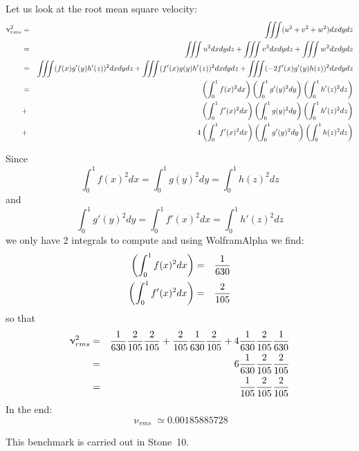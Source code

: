 Let us look at the root mean square velocity:
\begin{eqnarray}
\upnu_{rms}^2 
&=& \iiint   (u^2+v^2+w^2) dxdydz \nonumber\\
&=& \iiint   u^2 dxdydz
+ \iiint   v^2 dxdydz
+ \iiint   w^2 dxdydz \nonumber\\
&=& \iiint  (f(x)g'(y)h'(z))^2 dxdydz
+ \iiint   (f'(x)g(y)h'(z))^2 dxdydz
+ \iiint   (-2f'(x)g'(y)h(z))^2 dxdydz \nonumber\\
&=& 
\left( \int_0^1 f(x)^2 dx \right)
\left( \int_0^1 g'(y)^2 dy \right)
\left( \int_0^1 h'(z)^2 dz \right) \nonumber\\
&+&
\left( \int_0^1 f'(x)^2 dx \right)
\left( \int_0^1 g(y)^2 dy \right)
\left( \int_0^1 h'(z)^2 dz \right) \nonumber\\
&+&4
\left( \int_0^1 f'(x)^2 dx \right)
\left( \int_0^1 g'(y)^2 dy \right)
\left( \int_0^1 h(z)^2 dz \right) \nonumber\\
\end{eqnarray}

Since 
\[
\int_0^1 f(x)^2 dx  =  \int_0^1 g(y)^2 dy
= \int_0^1 h(z)^2 dz
\]
and
\[
\int_0^1 g'(y)^2 dy = \int_0^1 f'(x)^2 dx  =  \int_0^1 h'(z)^2 dz
\]
we only have 2 integrals to compute and using WolframAlpha we find:
\begin{eqnarray}
\left( \int_0^1 f(x)^2 dx \right) &=& \frac{1}{630}\nonumber\\
\left( \int_0^1 f'(x)^2 dx \right) &=& \frac{2}{105} \nonumber
\end{eqnarray}
so that 
\begin{eqnarray}
\upnu_{rms}^2 
&=&
\frac{1}{630} \frac{2}{105}\frac{2}{105}
+\frac{2}{105} \frac{1}{630} \frac{2}{105}
+ 4 \frac{1}{630} \frac{2}{105} \frac{1}{630} \nonumber\\
&=& 6 \frac{1}{630} \frac{2}{105}\frac{2}{105} \nonumber\\
&=&  \frac{1}{105} \frac{2}{105}\frac{2}{105} 
\end{eqnarray}
In the end:
\[
\upnu_{rms} \simeq 0.00185885728
\]

This benchmark is carried out in Stone~10.










